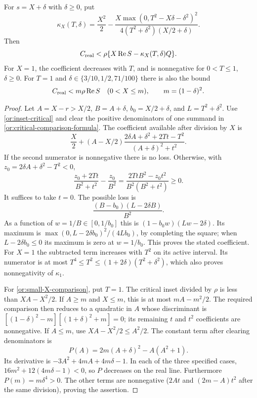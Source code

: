 \begin{lemma}\label{or:critical-comparison}
For $s=X+\delta$ with $\delta\ge0$, put
\begin{equation}\label{or:kappa}
 \kappa_X(T,\delta)=\frac{X^2}{2}
 -\frac{X\max(0,T^2-X\delta-\delta^2)^2}
             {4(T^2+\delta^2)(X/2+\delta)}.
\end{equation}
Then
\begin{equation}\label{or:critical-comparison-formula}
 C_{\rm real}<\rho\{X\Re S-\kappa_X(T,\delta)Q\}.
\end{equation}
For $X=1$, the coefficient decreases with $T$, and is nonnegative for
$0<T\le1$, $\delta\ge0$.  For $T=1$ and
$\delta\in\{3/10,1/2,71/100\}$ there is also the bound
\begin{equation}\label{or:small-X-comparison}
 C_{\rm real}<m\rho\Re S\quad(0<X\le m),\qquad
                         m=(1-\delta)^2.
\end{equation}
\end{lemma}
\begin{proof}
Let $A=X-r>X/2$, $B=A+\delta$, $b_0=X/2+\delta$, and
$L=T^2+\delta^2$.  Use \eqref{or:inset-critical} and clear the
positive denominators of one summand in
\eqref{or:critical-comparison-formula}.  The coefficient available
after division by $X$ is
\[
 \frac X2+(A-X/2)
       \frac{2\delta A+\delta^2+2Tt-T^2}{(A+\delta)^2+t^2}.
\]
If the second numerator is nonnegative there is no loss.  Otherwise,
with $z_0=2\delta A+\delta^2-T^2<0$,
\[
 \frac{z_0+2Tt}{B^2+t^2}-\frac{z_0}{B^2}
       =\frac{2TtB^2-z_0t^2}{B^2(B^2+t^2)}\ge0.
\]
It suffices to take $t=0$.  The possible loss is
\[
 \frac{(B-b_0)(L-2\delta B)}{B^2}.
\]
As a function of $w=1/B\in[0,1/b_0]$ this is
$(1-b_0w)(Lw-2\delta)$.  Its maximum is
$\max(0,L-2\delta b_0)^2/(4Lb_0)$, by completing the square; when
$L-2\delta b_0\le0$ its maximum is zero at $w=1/b_0$.
This proves the stated coefficient.  For $X=1$ the subtracted term
increases with $T^2$ on its active interval.  Its numerator is at
most $T^4\le T^2\le(1+2\delta)(T^2+\delta^2)$, which also proves
nonnegativity of $\kappa_1$.

For \eqref{or:small-X-comparison}, put $T=1$.  The critical inset
divided by $\rho$ is less than $XA-X^2/2$.  If $A\ge m$ and $X\le m$,
this is at most $mA-m^2/2$.  The required comparison then reduces to
a quadratic in $A$ whose discriminant is
$[(1-\delta)^2-m][(1+\delta)^2+m]=0$; its remaining $t$ and $t^2$
coefficients are nonnegative.  If $A\le m$, use
$XA-X^2/2\le A^2/2$.  The constant term after clearing denominators is
\[
 P(A)=2m(A+\delta)^2-A(A^2+1).
\]
Its derivative is $-3A^2+4mA+4m\delta-1$.  In each of the three
specified cases,
$16m^2+12(4m\delta-1)<0$, so $P$ decreases on the real line.
Furthermore $P(m)=m\delta^4>0$.  The other terms are nonnegative
($2At$ and $(2m-A)t^2$ after the same division), proving the assertion.
\end{proof}

